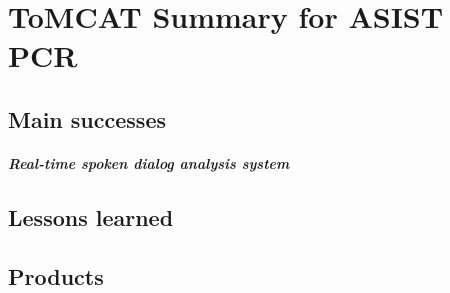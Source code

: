 \documentclass[11pt,article,oneside]{memoir}
\begin{document}
\chapter*{ToMCAT Summary for ASIST PCR}

\section{Main successes}

\paragraph{Real-time spoken dialog analysis system}
\section{Lessons learned}
\section{Products}
\end{document}
